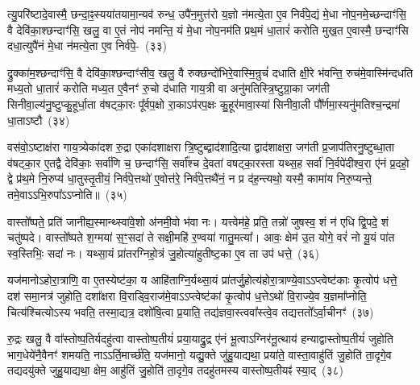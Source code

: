 त्यु॒परि॑ष्टादे॒वास्मै॒ छन्दा॒ꣴ॒स्यया॑तयामा॒न्यव॑ रुन्ध॒ उपै॑न॒मुत्त॑रो य॒ज्ञो न॑मत्ये॒ता ए॒व निर्व॑पे॒द्यं मे॒धा नोप॒नमे॒च्छन्दाꣳ॑सि॒ वै देवि॑का॒श्छन्दाꣳ॑सि॒ खलु॒ वा ए॒तं नोप॑ नमन्ति॒ यं मे॒धा नोप॒नम॑ति प्रथ॒मं धा॒तारं॑ करोति मुख॒त ए॒वास्मै॒ छन्दाꣳ॑सि दधा॒त्युपै॑नं मे॒धा न॑मत्ये॒ता ए॒व निर्व॑पे॒-~(३३)\ip

द्रुक्का॑म॒श्छन्दाꣳ॑सि॒ वै देवि॑का॒श्छन्दाꣳ॑सीव॒ खलु॒ वै रुक्छन्दो॑भिरे॒वास्मि॒न्रुचं॑ दधाति क्षी॒रे भ॑वन्ति॒ रुच॑मे॒वास्मि॑न्दधति मध्य॒तो धा॒तारं॑ करोति मध्य॒त ए॒वैनꣳ॑ रु॒चो द॑धाति गाय॒त्री वा अनु॑मतिस्त्रि॒ष्टुग्रा॒का जग॑ती सिनीवा॒ल्य॑नु॒ष्टुप्कु॒हूर्धा॒ता व॑षट्का॒रः पू᳚र्वप॒क्षो रा॒का\-ऽप॑रप॒क्षः कु॒हूर॑मावा॒स्या॑ सिनीवा॒ली पौ᳚र्णमा॒स्यनु॑\-मतिश्च॒न्द्रमा॑ धा॒ता\-ऽष्टौ~(३४)\ip

वस॑वो॒\-ऽष्टाक्ष॑रा गाय॒त्र्येका॑\-दश रु॒द्रा एका॑\-दशाक्षरा त्रि॒ष्टुब्द्वाद॑शादि॒त्या द्वाद॑शाक्षरा॒ जग॑ती प्र॒जा\-प॑तिरनु॒ष्टुब्धा॒ता व॑षट्का॒र ए॒तद्वै देवि॑काः॒ सर्वा॑णि च॒ छन्दाꣳ॑सि॒ सर्वा᳚श्च दे॒वता॑ वषट्का॒रस्ता यथ्स॒ह सर्वा॑ नि॒र्वपे॑दीश्व॒रा ए॑नं प्र॒दहो॒ द्वे प्र॑थ॒मे नि॒रुप्य॑ धा॒तुस्तृ॒तीयं॒ निर्व॑पे॒त्तथो॑ ए॒वोत्त॑रे॒ निर्व॑पे॒त्तथै॑नं॒ न प्र द॑ह॒न्त्यथो॒ यस्मै॒ कामा॑य निरु॒प्यन्ते॒ तमे॒वा\-ऽऽ\-भि॒रुपा᳚\-ऽऽ\-प्नोति॥~(३५)\ip

{\anuvakamend[{प॒शुका॑म॒श्छन्दाꣳ॑सि॒ वै देवि॑का॒श्छन्दाꣳ॑सि॒ ग्राम॑ङ्कल्पयत्ये॒ता ए॒व निरु॑त्त॒मन्धा॒तारं॑ करोति मे॒धा न॑मत्ये॒ता ए॒व निर्व॑पेद॒ष्टौ द॑हन्ति॒ नव॑ च॥ देविकाः प्रजाकामो मिथुनी पशुकाम}]}

वास्तो᳚ष्पते॒ प्रति॑ जानीह्य॒स्मान्थ्\-स्वा॑वे॒शो अ॑नमी॒वो भ॑वा नः। यत्त्वेम॑हे॒ प्रति॒ तन्नो॑ जुषस्व॒ शं न॑ एधि द्वि॒पदे॒ शं चतु॑ष्पदे। वास्तो᳚ष्पते श॒ग्मया॑ स॒ꣳ॒सदा॑ ते सक्षी॒महि॑ र॒ण्वया॑ गातु॒मत्या᳚। आवः॒ क्षेम॑ उ॒त योगे॒ वरं॑ नो यू॒यं पा॑त स्व॒स्तिभिः॒ सदा॑ नः। यथ्सा॒यं प्रा॑तरग्निहो॒त्रं जु॒होत्या॑हुतीष्ट॒का ए॒व ता उप॑ धत्ते॒~(३६)\ip

यज॑मानो\-ऽहोरा॒त्राणि॒ वा ए॒तस्येष्ट॑का॒ य आहि॑ताग्नि॒र्यथ्सा॒यं प्रा॑तर्जु॒होत्य॑होरा॒त्राण्ये॒वा\-ऽऽ\-प्त्वेष्ट॑काः कृ॒त्वोप॑ धत्ते॒ दश॑ समा॒नत्र॑ जुहोति॒ दशा᳚क्षरा वि॒राड्वि॒राज॑मे॒वा\-ऽऽ\-प्त्वेष्ट॑कां कृ॒त्वोप॑ ध॒त्ते\-ऽथो॑ वि॒राज्ये॒व य॒ज्ञमा᳚प्नोति॒ चित्य॑श्चित्यो\-ऽस्य भवति॒ तस्मा॒द्यत्र॒ दशो॑षि॒त्वा प्र॒याति॒ तद्य॑ज्ञवा॒स्त्ववा᳚स्त्वे॒व तद्यत्ततो᳚\-ऽर्वा॒चीनꣳ॑~(३७)\ip

रु॒द्रः खलु॒ वै वा᳚स्तोष्प॒तिर्यदहु॑त्वा वास्तोष्प॒तीयं॑ प्रया॒याद्रु॒द्र ए॑नं भू॒त्वा\-ऽग्निर॑नू॒त्थाय॑ हन्याद्वास्तोष्प॒तीयं॑ जुहोति भाग॒\-धेये॑नै॒वैनꣳ॑ शमयति॒ नाऽऽर्ति॒मार्च्छ॑ति॒ यज॑मानो॒ यद्यु॒क्ते जु॑हु॒याद्यथा॒ प्रया॑ते॒ वास्ता॒वाहु॑तिं जु॒होति॑ ता॒दृगे॒व तद्यदयु॑क्ते जुहु॒याद्यथा॒ क्षेम॒ आहु॑तिं जु॒होति॑ ता॒दृगे॒व तदहु॑तमस्य वास्तोष्प॒तीयꣴ॑ स्या॒द्~(३८)\ip

